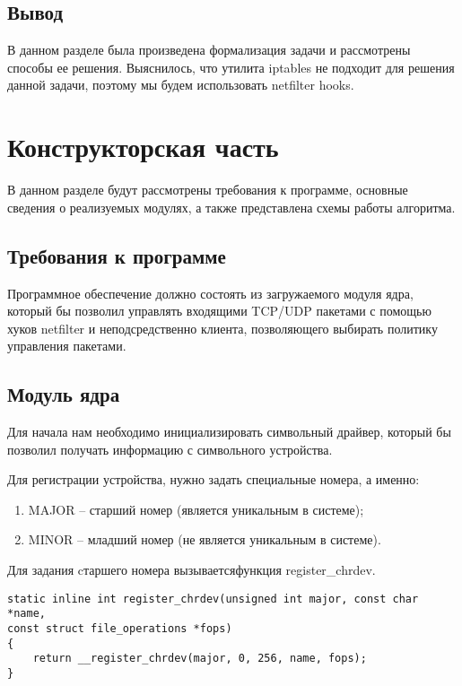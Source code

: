 \subsection*{Вывод}
В данном разделе была произведена формализация задачи и рассмотрены способы ее решения. Выяснилось, что утилита iptables не подходит для решения данной задачи, поэтому мы будем использовать netfilter hooks. 
\newpage

\section*{Конструкторская часть}
В данном разделе будут рассмотрены требования к программе, основные сведения о реализуемых модулях, а также представлена схемы работы алгоритма.
\subsection*{Требования к программе}
Программное обеспечение должно состоять из загружаемого модуля ядра, который бы позволил управлять входящими TCP/UDP пакетами с помощью хуков netfilter и неподсредственно клиента, позволяющего выбирать политику управления пакетами.
\subsection*{Модуль ядра}

Для начала нам необходимо инициализировать символьный драйвер, который бы позволил получать информацию с символьного устройства.

Для регистрации устройства, нужно задать специальные номера, а именно:
\begin{enumerate}
	\item MAJOR -- старший номер (является уникальным в системе);
	\item MINOR -- младший номер (не является уникальным в системе).
\end{enumerate}

Для задания cтаршего номера вызываетсяфункция register\_chrdev.
\begin{lstlisting}[caption=func register\_chrdev]
static inline int register_chrdev(unsigned int major, const char *name,
const struct file_operations *fops)
{
	return __register_chrdev(major, 0, 256, name, fops);
}
\end{lstlisting}

